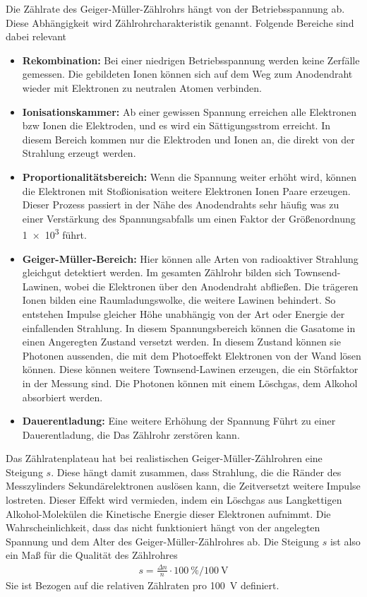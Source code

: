 Die Zählrate des Geiger-Müller-Zählrohrs hängt von der Betriebsspannung ab.
Diese Abhängigkeit wird Zählrohrcharakteristik genannt. 
Folgende Bereiche sind dabei relevant
\begin{itemize}
    \item \textbf{Rekombination:} Bei einer niedrigen Betriebsspannung werden keine Zerfälle gemessen.
    Die gebildeten Ionen können sich auf dem Weg zum Anodendraht wieder mit Elektronen zu neutralen Atomen verbinden.
    \item \textbf{Ionisationskammer:} Ab einer gewissen Spannung erreichen alle Elektronen bzw Ionen die Elektroden, und es wird ein Sättigungsstrom erreicht.
    In diesem Bereich kommen nur die Elektroden und Ionen an, die direkt von der Strahlung erzeugt werden.
    \item \textbf{Proportionalitätsbereich:} Wenn die Spannung weiter erhöht wird, können die Elektronen mit Stoßionisation weitere Elektronen Ionen Paare erzeugen. 
    Dieser Prozess passiert in der Nähe des Anodendrahts sehr häufig was zu einer Verstärkung des Spannungsabfalls um einen Faktor der Größenordnung \num{1e3} führt.
    \item \textbf{Geiger-Müller-Bereich:}
    Hier können alle Arten von radioaktiver Strahlung gleichgut detektiert werden.
    Im gesamten Zählrohr bilden sich Townsend-Lawinen, wobei die Elektronen über den Anodendraht abfließen.
    Die trägeren Ionen bilden eine Raumladungswolke, die weitere Lawinen behindert. 
    So entstehen Impulse gleicher Höhe unabhängig von der Art oder Energie der einfallenden Strahlung.
    In diesem Spannungsbereich können die Gasatome in einen Angeregten Zustand versetzt werden.
    In diesem Zustand können sie Photonen aussenden, die mit dem Photoeffekt Elektronen von der Wand lösen können.
    Diese können weitere Townsend-Lawinen erzeugen, die ein Störfaktor in der Messung sind.
    Die Photonen können mit einem Löschgas, dem Alkohol absorbiert werden.
    \item \textbf{Dauerentladung:} Eine weitere Erhöhung der Spannung Führt zu einer Dauerentladung, die Das Zählrohr zerstören kann. 
\end{itemize}

Das Zählratenplateau hat bei realistischen Geiger-Müller-Zählrohren eine Steigung $s$.
Diese hängt damit zusammen, dass Strahlung, die die Ränder des Messzylinders Sekundärelektronen auslösen kann, die Zeitversetzt weitere Impulse lostreten.
Dieser Effekt wird vermieden, indem ein Löschgas aus Langkettigen Alkohol-Molekülen die Kinetische Energie dieser Elektronen aufnimmt.
Die Wahrscheinlichkeit, dass das nicht funktioniert hängt von der angelegten Spannung und dem Alter des Geiger-Müller-Zählrohres ab.
Die Steigung $s$ ist also ein Maß für die Qualität des Zählrohres
\begin{align}
    s = \frac{\Delta n}{n} \cdot \qty{100}{\percent}/\qty{100}{\volt}
\end{align}
Sie ist Bezogen auf die relativen Zählraten pro \qty{100}{\volt} definiert.

